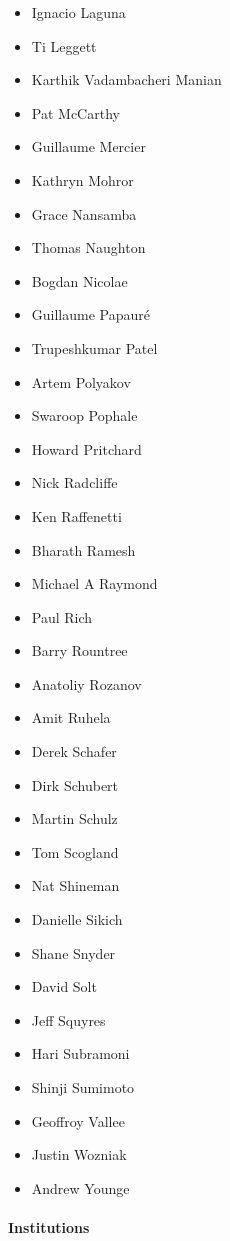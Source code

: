 \begin{itemize}
    \item Ignacio Laguna
    \item Ti Leggett
    \item Karthik Vadambacheri Manian
    \item Pat McCarthy
    \item Guillaume Mercier
    \item Kathryn Mohror
    \item Grace Nansamba
    \item Thomas Naughton
    \item Bogdan Nicolae
    \item Guillaume Papauré
    \item Trupeshkumar Patel
    \item Artem Polyakov
    \item Swaroop Pophale
    \item Howard Pritchard
    \item Nick Radcliffe
    \item Ken Raffenetti
    \item Bharath Ramesh
    \item Michael A Raymond
    \item Paul Rich
    \item Barry Rountree
    \item Anatoliy Rozanov
    \item Amit Ruhela
    \item Derek Schafer
    \item Dirk Schubert
    \item Martin Schulz
    \item Tom Scogland
    \item Nat Shineman
    \item Danielle Sikich
    \item Shane Snyder
    \item David Solt
    \item Jeff Squyres
    \item Hari Subramoni
    \item Shinji Sumimoto
    \item Geoffroy Vallee
    \item Justin Wozniak
    \item Andrew Younge
\end{itemize}

\paragraph*{Institutions}

